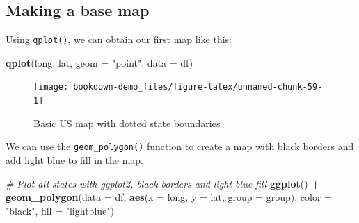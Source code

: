 \documentclass[]{book}
\newenvironment{Shaded}{\begin{snugshade}}{\end{snugshade}}
\newcommand{\KeywordTok}[1]{\textcolor[rgb]{0.13,0.29,0.53}{\textbf{#1}}}
\newcommand{\DataTypeTok}[1]{\textcolor[rgb]{0.13,0.29,0.53}{#1}}
\newcommand{\DecValTok}[1]{\textcolor[rgb]{0.00,0.00,0.81}{#1}}
\newcommand{\StringTok}[1]{\textcolor[rgb]{0.31,0.60,0.02}{#1}}
\newcommand{\CommentTok}[1]{\textcolor[rgb]{0.56,0.35,0.01}{\textit{#1}}}
\newcommand{\OperatorTok}[1]{\textcolor[rgb]{0.81,0.36,0.00}{\textbf{#1}}}
\newcommand{\NormalTok}[1]{#1}
\begin{document}
\begin{Shaded}
\end{Shaded}

\subsection{Making a base map}\label{making-a-base-map}

Using \texttt{qplot()}, we can obtain our first map like this:

\begin{Shaded}
\begin{Highlighting}[]
\KeywordTok{qplot}\NormalTok{(long, lat, }\DataTypeTok{geom =} \StringTok{"point"}\NormalTok{, }\DataTypeTok{data =}\NormalTok{ df)}
\end{Highlighting}
\end{Shaded}

\begin{figure}

{\centering \texttt{[image: bookdown-demo\_files/figure-latex/unnamed-chunk-59-1]} 

}

\caption{Basic US map with dotted state boundaries}\label{fig:unnamed-chunk-59}
\end{figure}

We can use the \texttt{geom\_polygon()} function to create a map with
black borders and add light blue to fill in the map.

\begin{Shaded}
\begin{Highlighting}[]
\CommentTok{# Plot all states with ggplot2, black borders and light blue fill}
\KeywordTok{ggplot}\NormalTok{() }\OperatorTok{+}\StringTok{ }
\StringTok{  }\KeywordTok{geom_polygon}\NormalTok{(}\DataTypeTok{data =}\NormalTok{ df, }
               \KeywordTok{aes}\NormalTok{(}\DataTypeTok{x =}\NormalTok{ long, }\DataTypeTok{y =}\NormalTok{ lat, }\DataTypeTok{group =}\NormalTok{ group),}
                \DataTypeTok{color =} \StringTok{"black"}\NormalTok{, }\DataTypeTok{fill =} \StringTok{"lightblue"}\NormalTok{)}
\end{Highlighting}
\end{Shaded}
\end{document}
